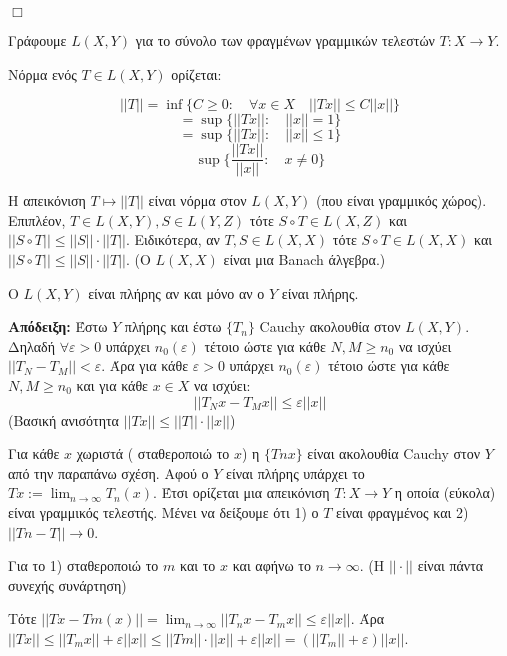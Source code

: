 \hfill $\Box$


Γράφουμε $L(X,Y)$ για το σύνολο των φραγμένων γραμμικών τελεστών $T: X \rightarrow Y$.

\begin{definition}
    Νόρμα ενός $T \in L(X,Y)$ ορίζεται: 

    $$||T|| = \inf \{ C \geq 0: \quad \forall x \in X \quad ||Tx|| \leq C ||x||\}$$
    $$=\sup \{ ||Tx||: \quad ||x||=1\}$$
    $$=\sup \{||Tx||: \quad ||x||\leq 1\}$$
    $$\sup \{ \frac{||Tx||}{||x||}: \quad x\neq 0\}$$
\end{definition}

\begin{protash}
    Η απεικόνιση $T \mapsto ||T||$ είναι νόρμα στον $L(X,Y)$ (που είναι γραμμικός χώρος). Επιπλέον, $T \in L(X,Y), S \in L(Y,Z)$ τότε $S\circ T \in L(X,Z)$ και $|| S\circ T ||\leq ||S|| \cdot ||T||$. Ειδικότερα, αν $T,S \in L(X,X)$ τότε $S\circ T \in L(X,X)$ και $||S\circ T|| \leq ||S|| \cdot ||T||$. (Ο $L(X,X)$ είναι μια Banach άλγεβρα.)

\end{protash}

\begin{theorem}Ο $L(X,Y)$ είναι πλήρης αν και μόνο αν ο $Y$ είναι πλήρης.
\end{theorem}

\textbf{Απόδειξη:} Έστω $Y$ πλήρης και έστω $\{T_n\}$ Cauchy ακολουθία στον $L(X,Y)$. Δηλαδή $\forall \varepsilon >0$ υπάρχει $n_0 (\varepsilon)$ τέτοιο ώστε για κάθε $N,M \geq n_0$ να ισχύει $||T_N - T_M|| < \varepsilon$. Άρα για κάθε $\varepsilon >0$ υπάρχει $n_0(\varepsilon)$ τέτοιο ώστε για κάθε $N,M\geq n_0$ και για κάθε $x \in X$ να ισχύει:
    $$||T_N x - T_M x || \leq \varepsilon ||x||$$ (Βασική ανισότητα $||Tx|| \leq ||T|| \cdot ||x||$)

    
    Για κάθε $x$ χωριστά ( σταθεροποιώ το $x$) η $\{Tn x\}$ είναι ακολουθία Cauchy στον $Y$ από την παραπάνω σχέση. Αφού ο $Y$ είναι πλήρης υπάρχει το $Tx := \lim_{n\rightarrow \infty} T_n (x)$. Έτσι ορίζεται μια απεικόνιση $T:X \rightarrow Y$ η οποία (εύκολα) είναι γραμμικός τελεστής. Μένει να δείξουμε ότι 1) ο $T$ είναι φραγμένος και 2) $||Tn-T||\rightarrow 0$.

    
    Για το 1) σταθεροποιώ το $m$ και το $x$ και αφήνω το $n\rightarrow \infty$. (Η $||\cdot ||$ είναι πάντα συνεχής συνάρτηση)

    
    Τότε $||Tx - Tm(x)|| = \lim_{n\rightarrow \infty}||T_n x - T_m x|| \leq \varepsilon ||x||$. Άρα $||Tx|| \leq ||T_m x|| + \varepsilon ||x|| \leq ||Tm||\cdot ||x|| + \varepsilon ||x|| = (||T_m|| + \varepsilon) ||x||$.

